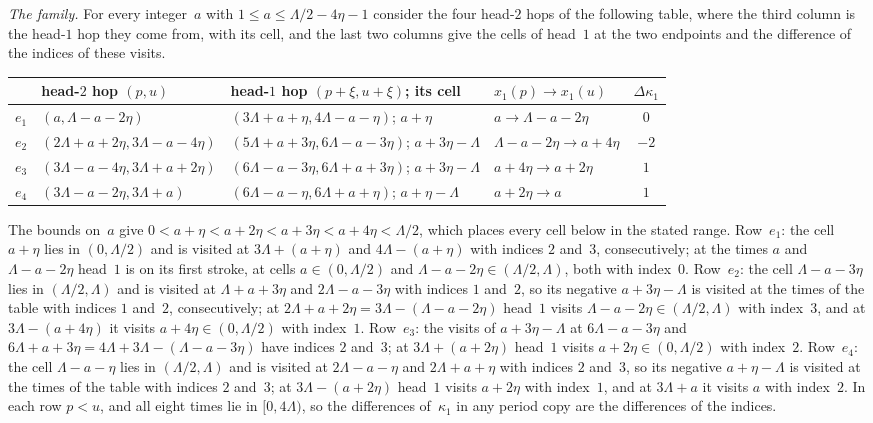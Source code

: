 \begin{informalproof}
\emph{The family.} For every integer~$a$ with $1\le a\le\Lambda/2-4\eta-1$ consider the four head-$2$ hops of the
following table, where the third column is the head-$1$ hop they come from, with its cell, and the last two columns
give the cells of head~$1$ at the two endpoints and the difference of the indices of these visits.
\begin{center}
\small
\begin{tabular}{@{}llllc@{}}
\toprule
& head-$2$ hop $(p,u)$ & head-$1$ hop $(p+\xi,u+\xi)$; its cell & $x_1(p)\to x_1(u)$ & $\Delta\kappa_1$\\
\midrule
$e_1$ & $(a,\Lambda-a-2\eta)$ & $(3\Lambda+a+\eta,4\Lambda-a-\eta)$; $a+\eta$ & $a\to\Lambda-a-2\eta$ & $0$\\
$e_2$ & $(2\Lambda+a+2\eta,3\Lambda-a-4\eta)$ & $(5\Lambda+a+3\eta,6\Lambda-a-3\eta)$; $a+3\eta-\Lambda$
& $\Lambda-a-2\eta\to a+4\eta$ & $-2$\\
$e_3$ & $(3\Lambda-a-4\eta,3\Lambda+a+2\eta)$ & $(6\Lambda-a-3\eta,6\Lambda+a+3\eta)$; $a+3\eta-\Lambda$
& $a+4\eta\to a+2\eta$ & $1$\\
$e_4$ & $(3\Lambda-a-2\eta,3\Lambda+a)$ & $(6\Lambda-a-\eta,6\Lambda+a+\eta)$; $a+\eta-\Lambda$
& $a+2\eta\to a$ & $1$\\
\bottomrule
\end{tabular}
\end{center}
The bounds on~$a$ give $0<a+\eta<a+2\eta<a+3\eta<a+4\eta<\Lambda/2$, which places every cell below in the stated range.
Row~$e_1$: the cell $a+\eta$ lies in $(0,\Lambda/2)$ and is visited at $3\Lambda+(a+\eta)$ and $4\Lambda-(a+\eta)$ with
indices $2$ and~$3$, consecutively; at the times $a$ and $\Lambda-a-2\eta$ head~$1$ is on its first stroke, at cells
$a\in(0,\Lambda/2)$ and $\Lambda-a-2\eta\in(\Lambda/2,\Lambda)$, both with index~$0$. Row~$e_2$: the cell
$\Lambda-a-3\eta$ lies in $(\Lambda/2,\Lambda)$ and is visited at $\Lambda+a+3\eta$ and $2\Lambda-a-3\eta$ with indices
$1$ and~$2$, so its negative $a+3\eta-\Lambda$ is visited at the times of the table with indices $1$ and~$2$,
consecutively; at $2\Lambda+a+2\eta=3\Lambda-(\Lambda-a-2\eta)$ head~$1$ visits
$\Lambda-a-2\eta\in(\Lambda/2,\Lambda)$ with index~$3$, and
at $3\Lambda-(a+4\eta)$ it visits $a+4\eta\in(0,\Lambda/2)$ with index~$1$. Row~$e_3$: the visits of
$a+3\eta-\Lambda$ at $6\Lambda-a-3\eta$ and $6\Lambda+a+3\eta=4\Lambda+3\Lambda-(\Lambda-a-3\eta)$ have indices
$2$ and~$3$; at $3\Lambda+(a+2\eta)$ head~$1$ visits $a+2\eta\in(0,\Lambda/2)$ with index~$2$. Row~$e_4$: the cell
$\Lambda-a-\eta$ lies in $(\Lambda/2,\Lambda)$ and is visited at $2\Lambda-a-\eta$ and $2\Lambda+a+\eta$ with indices
$2$ and~$3$, so its negative $a+\eta-\Lambda$ is visited at the times of the table with indices $2$ and~$3$; at
$3\Lambda-(a+2\eta)$ head~$1$ visits $a+2\eta$ with index~$1$, and at $3\Lambda+a$ it visits $a$ with index~$2$. In
each row $p<u$, and all eight times lie in $[0,4\Lambda)$, so the
differences of~$\kappa_1$ in any period copy are the differences of the indices.


\end{informalproof}
